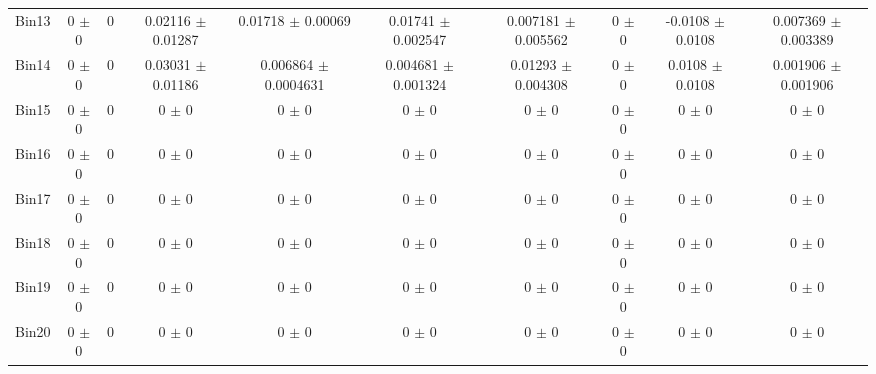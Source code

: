 \begin{tabular}{@{\extracolsep{4pt}}lccccccccc@{}}
     Bin13 & 0 $\pm$ 0 & 0 & 0.02116 $\pm$ 0.01287 & 0.01718 $\pm$ 0.00069 & 0.01741 $\pm$ 0.002547 & 0.007181 $\pm$ 0.005562 & 0 $\pm$ 0 & -0.0108 $\pm$ 0.0108 & 0.007369 $\pm$ 0.003389 \\ 
     Bin14 & 0 $\pm$ 0 & 0 & 0.03031 $\pm$ 0.01186 & 0.006864 $\pm$ 0.0004631 & 0.004681 $\pm$ 0.001324 & 0.01293 $\pm$ 0.004308 & 0 $\pm$ 0 & 0.0108 $\pm$ 0.0108 & 0.001906 $\pm$ 0.001906 \\ 
     Bin15 & 0 $\pm$ 0 & 0 & 0 $\pm$ 0 & 0 $\pm$ 0 & 0 $\pm$ 0 & 0 $\pm$ 0 & 0 $\pm$ 0 & 0 $\pm$ 0 & 0 $\pm$ 0 \\ 
     Bin16 & 0 $\pm$ 0 & 0 & 0 $\pm$ 0 & 0 $\pm$ 0 & 0 $\pm$ 0 & 0 $\pm$ 0 & 0 $\pm$ 0 & 0 $\pm$ 0 & 0 $\pm$ 0 \\ 
     Bin17 & 0 $\pm$ 0 & 0 & 0 $\pm$ 0 & 0 $\pm$ 0 & 0 $\pm$ 0 & 0 $\pm$ 0 & 0 $\pm$ 0 & 0 $\pm$ 0 & 0 $\pm$ 0 \\ 
     Bin18 & 0 $\pm$ 0 & 0 & 0 $\pm$ 0 & 0 $\pm$ 0 & 0 $\pm$ 0 & 0 $\pm$ 0 & 0 $\pm$ 0 & 0 $\pm$ 0 & 0 $\pm$ 0 \\ 
     Bin19 & 0 $\pm$ 0 & 0 & 0 $\pm$ 0 & 0 $\pm$ 0 & 0 $\pm$ 0 & 0 $\pm$ 0 & 0 $\pm$ 0 & 0 $\pm$ 0 & 0 $\pm$ 0 \\ 
     Bin20 & 0 $\pm$ 0 & 0 & 0 $\pm$ 0 & 0 $\pm$ 0 & 0 $\pm$ 0 & 0 $\pm$ 0 & 0 $\pm$ 0 & 0 $\pm$ 0 & 0 $\pm$ 0 \\ 
\hline\hline
  \end{tabular}
